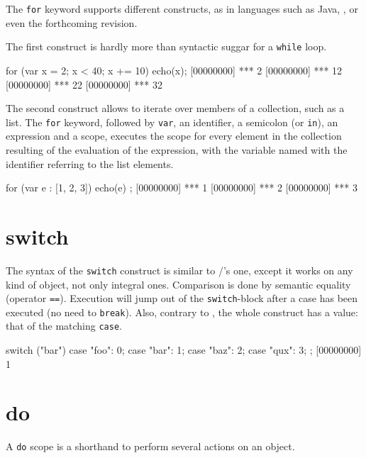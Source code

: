 The \lstinline{for} keyword supports different constructs, as in
languages such as Java, \Cs, or even the forthcoming \Cxx revision.

The first construct is hardly more than syntactic suggar for a
\lstinline{while} loop.

\begin{urbiscript}[firstnumber=last]
for (var x = 2; x < 40; x += 10)
  echo(x);
[00000000] *** 2
[00000000] *** 12
[00000000] *** 22
[00000000] *** 32
\end{urbiscript}

The second construct allows to iterate over members of a collection,
such as a list. The \lstinline{for} keyword, followed by
\lstinline|var|, an identifier, a semicolon (or \lstinline|in|), an
expression and a scope, executes the scope for every element in the
collection resulting of the evaluation of the expression, with the
variable named with the identifier referring to the list
elements.

\begin{urbiscript}[firstnumber=last]
for (var e : [1, 2, 3]) { echo(e) };
[00000000] *** 1
[00000000] *** 2
[00000000] *** 3
\end{urbiscript}

\section{switch}

The syntax of the \lstinline|switch| construct is similar to \C/\Cxx's
one, except it works on any kind of object, not only integral
ones. Comparison is done by semantic equality (operator
\lstinline{==}). Execution will jump out of the
\lstinline|switch|-block after a case has been executed (no need to
\lstinline{break}).  Also, contrary to \Cxx, the whole construct has a
value: that of the matching \lstinline{case}.

\begin{urbiscript}[firstnumber=last]
switch ("bar")
{
  case "foo":  0;
  case "bar":  1;
  case "baz":  2;
  case "qux":  3;
};
[00000000] 1
\end{urbiscript}

\section{do}
\label{section:constructs:do}

A \lstinline|do| scope is a shorthand to perform several actions on an
object.

